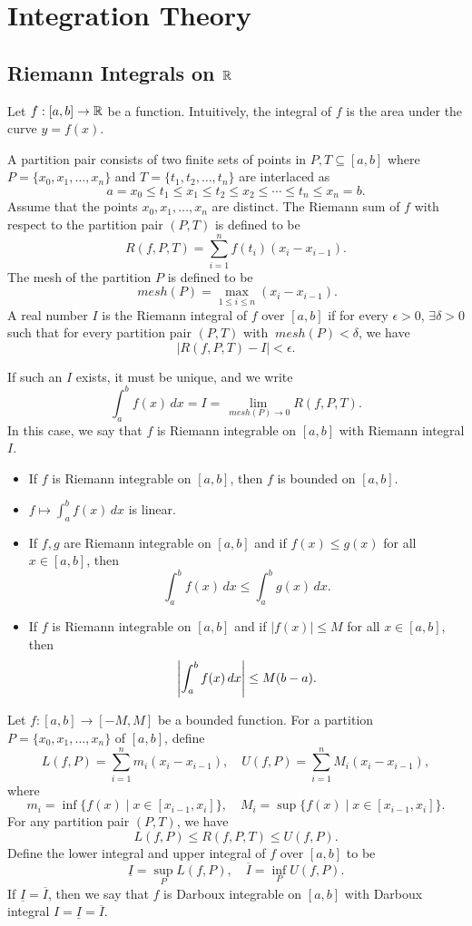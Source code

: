 \chapter{Integration Theory}

\section{Riemann Integrals on ${\mathbb R}$}

Let $f: [a, b] \to {\mathbb R}$ be a function. Intuitively, the integral of $f$ is the area under the curve $y = f(x)$. 

A partition pair consists of two finite sets of points in $P, T \subseteq [a, b]$ where $P = \{x_0, x_1, \ldots, x_n\}$ and $T = \{t_1, t_2, \ldots, t_n\}$ are interlaced as
\[
a = x_0 \leq t_1 \leq x_1 \leq t_2 \leq x_2 \leq \cdots \leq t_n \leq x_n = b.
\]
Assume that the points $x_0, x_1, \ldots, x_n$ are distinct. The Riemann sum of $f$ with respect to the partition pair $(P, T)$ is defined to be
\[
R(f, P, T) = \sum_{i=1}^n f(t_i)(x_i - x_{i-1}).
\]
The mesh of the partition $P$ is defined to be
\[
~mesh (P) = \max_{1 \leq i \leq n} (x_i - x_{i-1}).
\]
A real number $I$ is the Riemann integral of $f$ over $[a, b]$ if for every $\epsilon > 0$, $\exists \delta > 0$ such that for every partition pair $(P, T)$ with $~mesh(P) < \delta$, we have
\[
|R(f, P, T) - I| < \epsilon.
\]

If such an $I$ exists, it must be unique, and we write
\[
\int_a^b f(x) \, dx = I = \lim_{~mesh(P) \to 0} R(f, P, T).
\]
In this case, we say that $f$ is Riemann integrable on $[a, b]$ with Riemann integral $I$.

\begin{itemize}
    \item If $f$ is Riemann integrable on $[a, b]$, then $f$ is bounded on $[a, b]$.
    \item $f \mapsto \int_a^b f(x) \, dx$ is linear.
    \item If $f, g$ are Riemann integrable on $[a, b]$ and if $f(x) \leq g(x)$ for all $x \in [a, b]$, then
    \[
    \int_a^b f(x) \, dx \leq \int_a^b g(x) \, dx.
    \]
    \item If $f$ is Riemann integrable on $[a, b]$ and if $|f(x)| \leq M$ for all $x \in [a, b]$, then
    \[
    {\left| \int_a^b f(x) \, dx \right|} \leq M(b - a).
    \]
\end{itemize}

Let $f: [a, b] \to [-M, M]$ be a bounded function. For a partition $P = \{x_0, x_1, \ldots, x_n\}$ of $[a, b]$, define
\[
L(f, P) = \sum_{i=1}^n m_i (x_i - x_{i-1}), \quad U(f, P) = \sum_{i=1}^n M_i (x_i - x_{i-1}),
\]
where
\[
m_i = \inf \{f(x) \mid x \in [x_{i-1}, x_i]\}, \quad M_i = \sup \{f(x) \mid x \in [x_{i-1}, x_i]\}.
\]
For any partition pair $(P, T)$, we have
\[
L(f, P) \leq R(f, P, T) \leq U(f, P).
\]
Define the lower integral and upper integral of $f$ over $[a, b]$ to be
\[
\underline{I} = \sup_P L(f, P), \quad \overline{I} = \inf_P U(f, P).
\]
If $\underline{I} = \overline{I}$, then we say that $f$ is Darboux integrable on $[a, b]$ with Darboux integral $I = \underline{I} = \overline{I}$.

